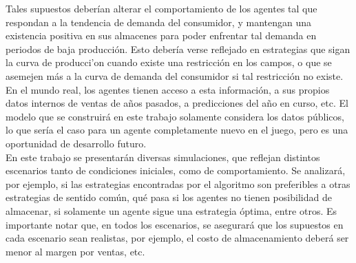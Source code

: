 Tales supuestos deber\'ian alterar el comportamiento de los agentes tal que respondan a la tendencia de demanda del consumidor, y mantengan una existencia positiva en sus almacenes para poder enfrentar tal demanda en periodos de baja producci\'on. Esto deber\'ia verse reflejado en estrategias que sigan la curva de producci'on cuando existe una restricci\'on en los campos, o que se asemejen m\'as  a la curva de demanda del consumidor si tal restricci\'on no existe.\\

En el mundo real, los agentes tienen acceso a esta informaci\'on, a sus propios datos internos de ventas de a\~nos pasados, a predicciones del a\~no en curso, etc. El modelo que se construir\'a en este trabajo solamente considera los datos p\'ublicos, lo que ser\'ia el caso para un agente completamente nuevo en el juego, pero es una oportunidad de desarrollo futuro.\\

En este trabajo se presentar\'an diversas simulaciones, que reflejan distintos escenarios tanto de condiciones iniciales, como de comportamiento. Se analizar\'a, por ejemplo, si las estrategias encontradas por el algoritmo son preferibles a otras estrategias de sentido com\'un, qu\'e pasa si los agentes no tienen posibilidad de almacenar, si solamente un agente sigue una estrategia \'optima, entre otros. Es importante notar que, en todos los escenarios, se asegurar\'a que los supuestos en cada escenario sean realistas, por ejemplo, el costo de almacenamiento deber\'a ser menor al margen por ventas, etc.


